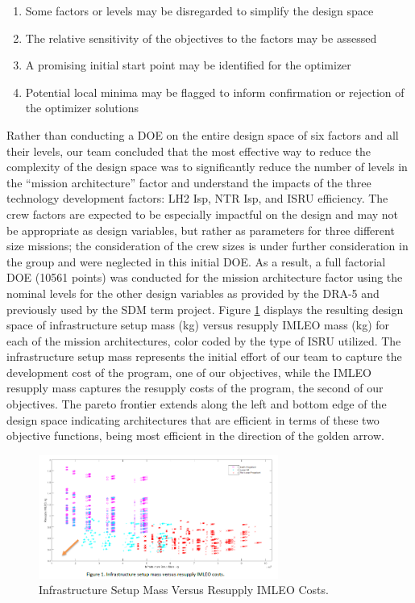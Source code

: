 \documentclass[]{aiaa-pretty}
\begin{document}
\begin{enumerate}
\item Some factors or levels may be disregarded to simplify the design space
\item The relative sensitivity of the objectives to the factors may be assessed
\item A promising initial start point may be identified for the optimizer
\item Potential local minima may be flagged to inform confirmation or rejection of the optimizer solutions
\end{enumerate}
Rather than conducting a DOE on the entire design space of six factors and all their levels, our team concluded that the most effective way to reduce the complexity of the design space was to significantly reduce the number of levels in the “mission architecture” factor and understand the impacts of the three technology development factors: LH2 Isp, NTR Isp, and ISRU efficiency. The crew factors are expected to be especially impactful on the design and may not be appropriate as design variables, but rather as parameters for three different size missions; the consideration of the crew sizes is under further consideration in the group and were neglected in this initial DOE. As a result, a full factorial DOE (10561 points) was conducted for the mission architecture factor using the nominal levels for the other design variables as provided by the DRA-5 and previously used by the SDM term project. Figure \ref{fig:infratrade} displays the resulting design space of infrastructure setup mass (kg) versus resupply IMLEO mass (kg) for each of the mission architectures, color coded by the type of ISRU utilized. The infrastructure setup mass represents the initial effort of our team to capture the development cost of the program, one of our objectives, while the IMLEO resupply mass captures the resupply costs of the program, the second of our objectives. The pareto frontier extends along the left and bottom edge of the design space indicating architectures that are efficient in terms of these two objective functions, being most efficient in the direction of the golden arrow.

\begin{figure}[h!]
	\centering
	\includegraphics[width=0.7\textwidth]{InfraTrade}
	\caption{Infrastructure Setup Mass Versus Resupply IMLEO Costs.}
	\label{fig:infratrade}
\end{figure}
\end{document}
